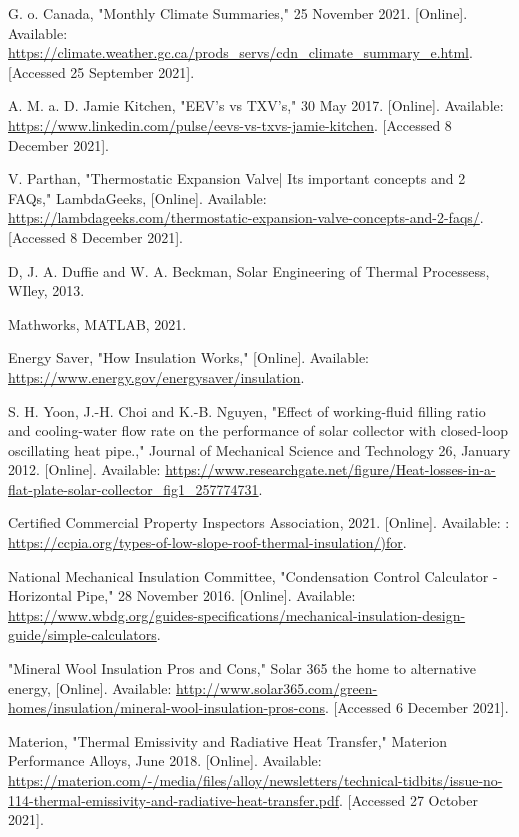 \documentclass{ucalgarythesis}
\begin{document}
\begin{thebibliography}{9}
     G. o. Canada, "Monthly Climate Summaries," 25 November 2021. [Online]. Available: \url{https://climate.weather.gc.ca/prods_servs/cdn_climate_summary_e.html}. [Accessed 25 September 2021].

     A. M. a. D. Jamie Kitchen, "EEV's vs TXV's," 30 May 2017. [Online]. Available: \url{https://www.linkedin.com/pulse/eevs-vs-txvs-jamie-kitchen}. [Accessed 8 December 2021].

     V. Parthan, "Thermostatic Expansion Valve| Its important concepts and 2 FAQs," LambdaGeeks, [Online]. Available: \url{https://lambdageeks.com/thermostatic-expansion-valve-concepts-and-2-faqs/}. [Accessed 8 December 2021].

     D, J. A. Duffie and W. A. Beckman, Solar Engineering of Thermal Processess, WIley, 2013. 
    
     Mathworks, MATLAB, 2021. 

     Energy Saver, "How Insulation Works," [Online]. Available: \url{https://www.energy.gov/energysaver/insulation}.

     S. H. Yoon, J.-H. Choi and K.-B. Nguyen, "Effect of working-fluid filling ratio and cooling-water flow rate on the performance of solar collector with closed-loop oscillating heat pipe.," Journal of Mechanical Science and Technology 26, January 2012. [Online]. Available: \url{https://www.researchgate.net/figure/Heat-losses-in-a-flat-plate-solar-collector_fig1_257774731}.
    
     Certified Commercial Property Inspectors Association, 2021. [Online]. Available: : \url{https://ccpia.org/types-of-low-slope-roof-thermal-insulation/)for}.
    
     National Mechanical Insulation Committee, "Condensation Control Calculator - Horizontal Pipe," 28 November 2016. [Online]. Available: \url{https://www.wbdg.org/guides-specifications/mechanical-insulation-design-guide/simple-calculators}.
    
     "Mineral Wool Insulation Pros and Cons," Solar 365 the home to alternative energy, [Online]. Available: \url{http://www.solar365.com/green-homes/insulation/mineral-wool-insulation-pros-cons}. [Accessed 6 December 2021].
    
     Materion, "Thermal Emissivity and Radiative Heat Transfer," Materion Performance Alloys, June 2018. [Online]. Available: \url{https://materion.com/-/media/files/alloy/newsletters/technical-tidbits/issue-no-114-thermal-emissivity-and-radiative-heat-transfer.pdf}. [Accessed 27 October 2021].
    

\end{thebibliography}
\end{document}
